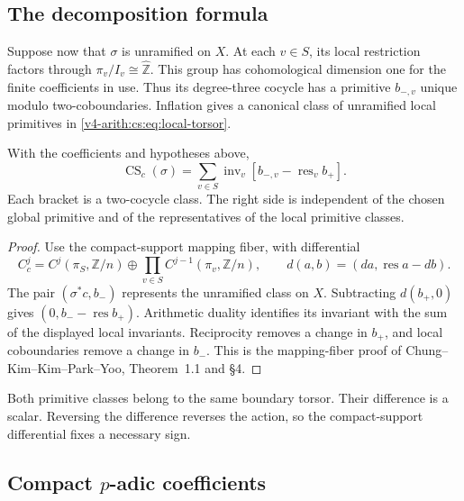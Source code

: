 \subsection{The decomposition formula}

Suppose now that \(\sigma\) is unramified on \(X\). At each \(v\in S\), its
local restriction factors through \(\pi_v/I_v\cong\widehat{\mathbb Z}\).
This group has cohomological dimension one for the finite coefficients in
use. Thus its degree-three cocycle has a primitive \(b_{-,v}\) unique modulo
two-coboundaries. Inflation gives a canonical class of unramified local
primitives in \eqref{v4-arith:cs:eq:local-torsor}.

\begin{theorem}
\label{v4-arith:cs:thm:decomposition}
With the coefficients and hypotheses above,
\begin{equation}
 \operatorname{CS}_c(\sigma)
  =\sum_{v\in S}\operatorname{inv}_v
          [b_{-,v}-\operatorname{res}_v b_+].
 \label{v4-arith:cs:eq:decomposition}
\end{equation}
Each bracket is a two-cocycle class. The right side is independent of the
chosen global primitive and of the representatives of the local primitive
classes.
\end{theorem}

\begin{proof}
Use the compact-support mapping fiber, with differential
\[
 C_c^j=C^j(\pi_S,\mathbb Z/n)
             \oplus\prod_{v\in S}C^{j-1}(\pi_v,\mathbb Z/n),
 \qquad
 d(a,b)=(da,\operatorname{res}a-db).
\]
The pair \((\sigma^*c,b_-)\) represents the unramified class on \(X\).
Subtracting \(d(b_+,0)\) gives \((0,b_--\operatorname{res}b_+)\). Arithmetic
duality identifies its invariant with the sum of the displayed local
invariants. Reciprocity removes a change in \(b_+\), and local coboundaries
remove a change in \(b_-\). This is the mapping-fiber proof of
Chung--Kim--Kim--Park--Yoo, Theorem~1.1 and \S4.
\end{proof}

Both primitive classes belong to the same boundary torsor. Their difference
is a scalar. Reversing the difference reverses the action, so the
compact-support differential fixes a necessary sign.

\subsection{Compact \(p\)-adic coefficients}

